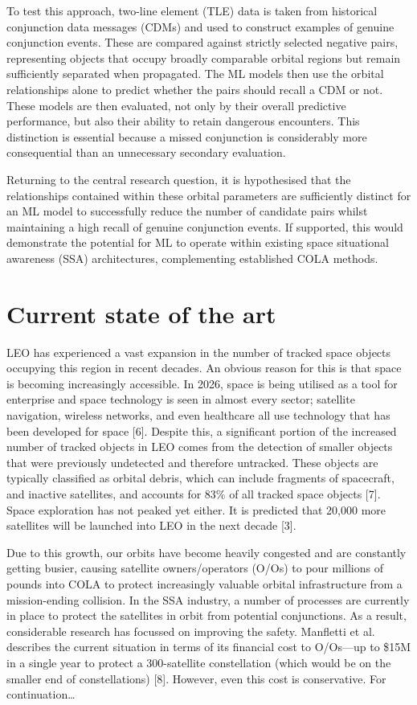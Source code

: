 \documentclass[letterpaper,11pt,leqno]{article}
\begin{document}
To test this approach, two-line element (TLE) data is taken from historical conjunction data messages (CDMs) and used to construct examples of genuine conjunction events. These are compared against strictly selected negative pairs, representing objects that occupy broadly comparable orbital regions but remain sufficiently separated when propagated. The ML models then use the orbital relationships alone to predict whether the pairs should recall a CDM or not. These models are then evaluated, not only by their overall predictive performance, but also their ability to retain dangerous encounters. This distinction is essential because a missed conjunction is considerably more consequential than an unnecessary secondary evaluation. 

Returning to the central research question, it is hypothesised that the relationships contained within these orbital parameters are sufficiently distinct for an ML model to successfully reduce the number of candidate pairs whilst maintaining a high recall of genuine conjunction events. If supported, this would demonstrate the potential for ML to operate within existing space situational awareness (SSA) architectures, complementing established COLA methods.


\section{Current state of the art}\label{s:section}

LEO has experienced a vast expansion in the number of tracked space objects occupying this region in recent decades. An obvious reason for this is that space is becoming increasingly accessible. In 2026, space is being utilised as a tool for enterprise and space technology is seen in almost every sector; satellite navigation, wireless networks, and even healthcare all use technology that has been developed for space [6]. Despite this, a significant portion of the increased number of tracked objects in LEO comes from the detection of smaller objects that were previously undetected and therefore untracked. These objects are typically classified as orbital debris, which can include fragments of spacecraft, and inactive satellites, and accounts for 83\% of all tracked space objects [7]. Space exploration has not peaked yet either. It is predicted that 20,000 more satellites will be launched into LEO in the next decade [3].

Due to this growth, our orbits have become heavily congested and are constantly getting busier, causing satellite owners/operators (O/Os) to pour millions of pounds into COLA to protect increasingly valuable orbital infrastructure from a mission-ending collision. In the SSA industry, a number of processes are currently in place to protect the satellites in orbit from potential conjunctions. As a result, considerable research has focussed on improving the safety. Manfletti et al. describes the current situation in terms of its financial cost to O/Os—up to \$15M in a single year to protect a 300-satellite constellation (which would be on the smaller end of constellations) [8]. However, even this cost is conservative. 
For continuation…
\end{document}

